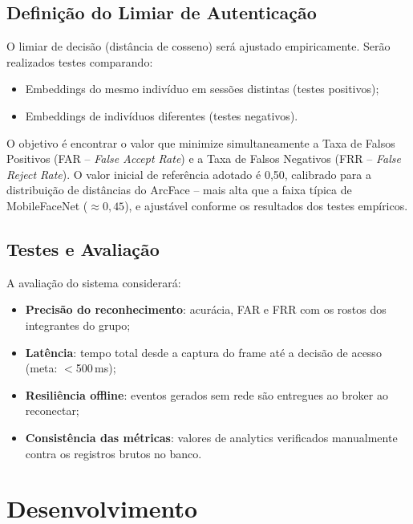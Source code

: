 \documentclass[12pt,a4paper]{report}
\begin{document}
\section{Definição do Limiar de Autenticação}

O limiar de decisão (distância de cosseno) será ajustado empiricamente. Serão realizados testes comparando:

\begin{itemize}
    \item Embeddings do mesmo indivíduo em sessões distintas (testes positivos);
    \item Embeddings de indivíduos diferentes (testes negativos).
\end{itemize}

O objetivo é encontrar o valor que minimize simultaneamente a Taxa de Falsos Positivos (FAR -- \textit{False Accept Rate}) e a Taxa de Falsos Negativos (FRR -- \textit{False Reject Rate}). O valor inicial de referência adotado é 0,50, calibrado para a distribuição de distâncias do ArcFace -- mais alta que a faixa típica de MobileFaceNet ($\approx 0{,}45$), e ajustável conforme os resultados dos testes empíricos.

\section{Testes e Avaliação}

A avaliação do sistema considerará:

\begin{itemize}
    \item \textbf{Precisão do reconhecimento}: acurácia, FAR e FRR com os rostos dos integrantes do grupo;
    \item \textbf{Latência}: tempo total desde a captura do frame até a decisão de acesso (meta: $<$500\,ms);
    \item \textbf{Resiliência offline}: eventos gerados sem rede são entregues ao broker ao reconectar;
    \item \textbf{Consistência das métricas}: valores de analytics verificados manualmente contra os registros brutos no banco.
\end{itemize}

\chapter{Desenvolvimento}
\end{document}
